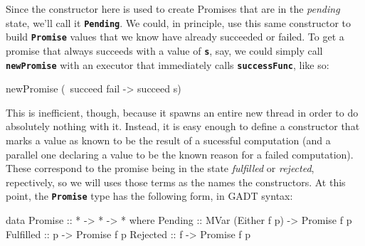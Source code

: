 \documentclass[12pt, english, letterpaper]{kuthesis}
\newcommand{\lit}[1]{\textbf{\texttt{#1}}}
\begin{document}
Since the constructor here is used to create \textsf{Promises} that are in the \emph{pending} state, we'll call it \lit{Pending}.  We could, in principle, use this same constructor to build \lit{Promise} values that we know have already succeeded or failed.  To get a promise that always succeeds with a value of \lit s, say, we could simply call \lit{newPromise} with an executor that immediately calls \lit{successFunc}, like so:
\begin{code}
newPromise (\ succeed fail -> succeed s)
\end{code}
This is inefficient, though, because it spawns an entire new thread in order to do absolutely nothing with it.  Instead, it is easy enough to define a constructor that marks a value as known to be the result of a sucessful computation (and a parallel one declaring a value to be the known reason for a failed computation).  These correspond to the promise being in the state \emph{fulfilled} or \emph{rejected}, repectively, so we will uses those terms as the names the constructors.  At this point, the \lit{Promise} type has the following form, in GADT syntax:
\begin{code}
data Promise :: * -> * -> * where
  Pending :: MVar (Either f p) -> Promise f p
  Fulfilled :: p -> Promise f p
  Rejected :: f -> Promise f p
\end{code}
\end{document}
